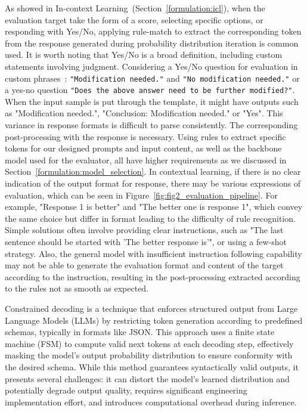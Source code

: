 \documentclass[acmsmall,screen]{acmart}
\begin{document}
As showed in In-context Learning~(Section~\ref{formulation:icl}), when the evaluation target take the form of a score, selecting specific options, or responding with Yes/No, applying rule-match to extract the corresponding token from the response generated during probability distribution iteration is common used. It is worth noting that Yes/No is a broad definition, including custom statements involving judgment.
Considering a Yes/No question for evaluation in custom phrases~\cite{ucla_creativity_macgyver}: \texttt{"Modification needed."} and \texttt{"No modification needed."} or a yes-no question \texttt{"Does the above answer need to be further modified?"}. 
When the input sample is put through the template, it might have outputs such as "Modification needed.", "Conclusion: Modification needed." or "Yes". This variance in response formats is difficult to parse consistently. The corresponding post-processing with the response is necessary. Using rules to extract specific tokens for our designed prompts and input content, as well as the backbone model used for the evaluator, all have higher requirements as we discussed in Section~\ref{formulation:model_selection}.
In contextual learning, if there is no clear indication of the output format for response, there may be various expressions of evaluation, which can be seen in Figure~\ref{fig:fig2_evaluation_pipeline}. For example, "Response 1 is better" and "The better one is response 1", which convey the same choice but differ in format leading to the difficulty of rule recognition. Simple solutions often involve providing clear instructions, such as "The last sentence should be started with 'The better response is'", or using a few-shot strategy.
Also, the general model with insufficient instruction following capability may not be able to generate the evaluation format and content of the target according to the instruction, resulting in the post-processing extracted according to the rules not as smooth as expected. 

Constrained decoding is a technique that enforces structured output from Large Language Models (LLMs) by restricting token generation according to predefined schemas, typically in formats like JSON. This approach uses a finite state machine (FSM) to compute valid next tokens at each decoding step, effectively masking the model's output probability distribution to ensure conformity with the desired schema. While this method guarantees syntactically valid outputs, it presents several challenges: it can distort the model's learned distribution and potentially degrade output quality, requires significant engineering implementation effort, and introduces computational overhead during inference.
\end{document}
